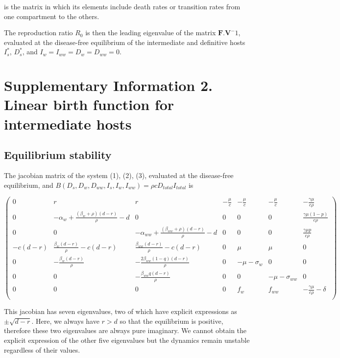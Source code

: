\documentclass[11pt]{article}
\begin{document}
is the matrix in which its elements include death rates or transition rates from one compartment to the others.

The reproduction ratio $R_0$ is then the leading eigenvalue of the matrix $\mathbf{F}.\mathbf{V}^-1$, evaluated at the disease-free equilibrium of the intermediate and definitive hosts $I_s^*$, $D_s^*$, and $I_w = I_{ww} = D_w = D_{ww} = 0$.

\section*{Supplementary Information 2. Linear birth function for intermediate hosts}

\subsection*{Equilibrium stability}

The jacobian matrix of the system (1), (2), (3), evaluated at the disease-free equilibrium, and $B(D_s, D_w, D_{ww}, I_s, I_w, I_{ww}) = \rho c D_{total} I_{total}$ is

\[
\begin{pmatrix}
0 & r & r & -\frac{\mu}{c} & -\frac{\mu }{c} & -\frac{\mu }{c} & -\frac{\gamma  \mu }{c \rho } \\
0 & -\alpha_w + \frac{(\beta_w + \rho ) (d-r)}{\rho } - d & 0 & 0 & 0 & 0 & \frac{\gamma  \mu  (1-p)}{c \rho } \\
0 & 0 & -\alpha_{ww} + \frac{(\beta_{ww} + \rho ) (d-r)}{\rho } - d & 0 & 0 & 0 & \frac{\gamma  \mu  p}{c \rho } \\
-c (d-r) & \frac{\beta_w (d-r)}{\rho } - c (d-r) & \frac{\beta_{ww} (d-r)}{\rho }-c (d-r) & 0 & \mu  & \mu  & 0 \\
0 & -\frac{\beta_w (d-r)}{\rho } & -\frac{2 \beta_{ww} (1-q) (d-r)}{\rho } & 0 & -\mu - \sigma_w & 0 & 0 \\
 0 & 0 & -\frac{\beta_{ww} q (d-r)}{\rho } & 0 & 0 & -\mu - \sigma_{ww} & 0 \\
 0 & 0 & 0 & 0 & f_w & f_{ww} & -\frac{\gamma  \mu }{c \rho } - \delta  \\
\end{pmatrix}
\]

This jacobian has seven eigenvalues, two of which have explicit expressions as $\pm \sqrt{d - r}$. Here, we always have $r > d$ so that the equilibrium is positive, therefore these two eigenvalues are always pure imaginary. We cannot obtain the explicit expression of the other five eigenvalues but the dynamics remain unstable regardless of their values.
\end{document}
